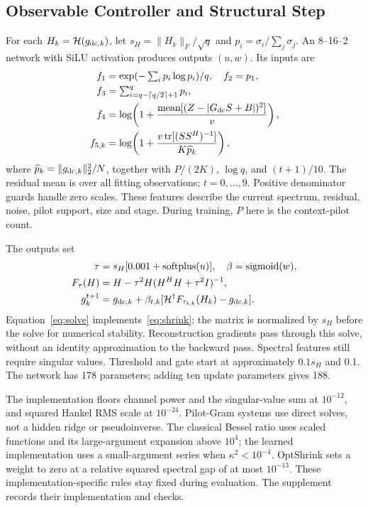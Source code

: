 \documentclass[10pt,journal,letterpaper]{IEEEtran}
\newcommand{\HH}{\mathcal{H}}
\DeclareMathOperator{\tr}{tr}
\DeclareMathOperator{\sigmoid}{sigmoid}
\DeclareMathOperator{\softplus}{softplus}
\begin{document}
\subsection{Observable Controller and Structural Step}
For each $H_k=\HH(g_{{\rm dc},k})$, let $s_H=\|H_k\|_F/\sqrt q$ and $p_i=\sigma_i/\sum_j\sigma_j$. An 8--16--2 network with SiLU activation produces outputs $(u,w)$. Its inputs are
\begin{align}
 f_1&=\exp(-\textstyle\sum_i p_i\log p_i)/q,\quad f_2=p_1,\nonumber\\
 f_3&=\textstyle\sum_{i=q-\lceil q/2\rceil+1}^q p_i,\label{eq:features}\\
 f_4&=\log\!\left(1+\frac{\operatorname{mean}[(Z-|G_{\rm dc}S+B|)^2]}{v}\right),\nonumber\\
 f_{5,k}&=\log\!\left(1+\frac{v\tr[(SS^H)^{-1}]}{K\widehat p_k}\right),\nonumber
\end{align}
where $\widehat p_k=\|g_{{\rm dc},k}\|_2^2/N$, together with $P/(2K)$, $\log q$, and $(t+1)/10$. The residual mean is over all fitting observations; $t=0,\ldots,9$. Positive denominator guards handle zero scales. These features describe the current spectrum, residual, noise, pilot support, size and stage. During training, $P$ here is the context-pilot count.

The outputs set
\begin{align}
 \tau&=s_H[0.001+\softplus(u)],\quad \beta=\sigmoid(w),\\
 F_\tau(H)&=H-\tau^2H(H^HH+\tau^2I)^{-1},\label{eq:solve}\\
 g_k^{t+1}&=g_{{\rm dc},k}+\beta_{t,k}
       [\HH^\dagger F_{\tau_{t,k}}(H_k)-g_{{\rm dc},k}].
\end{align}
Equation~\eqref{eq:solve} implements~\eqref{eq:shrink}; the matrix is normalized by $s_H$ before the solve for numerical stability. Reconstruction gradients pass through this solve, without an identity approximation to the backward pass. Spectral features still require singular values. Threshold and gate start at approximately $0.1s_H$ and 0.1. The network has 178 parameters; adding ten update parameters gives 188.

The implementation floors channel power and the singular-value sum at $10^{-12}$, and squared Hankel RMS scale at $10^{-24}$. Pilot-Gram systems use direct solves, not a hidden ridge or pseudoinverse. The classical Bessel ratio uses scaled functions and its large-argument expansion above $10^4$; the learned implementation uses a small-argument series when $\kappa^2<10^{-4}$. OptShrink sets a weight to zero at a relative squared spectral gap of at most $10^{-13}$. These implementation-specific rules stay fixed during evaluation. The supplement records their implementation and checks.
\end{document}

